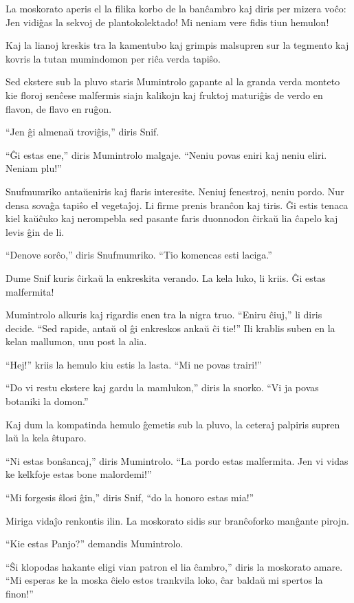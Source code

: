 La moskorato aperis el la filika korbo de la banĉambro kaj diris per mizera voĉo: Jen vidiĝas la sekvoj de plantokolektado! Mi neniam vere fidis tiun hemulon!

Kaj la lianoj kreskis tra la kamentubo kaj grimpis malsupren sur la tegmento kaj kovris la tutan mumindomon per riĉa verda tapiŝo.

Sed ekstere sub la pluvo staris Mumintrolo gapante al la granda verda monteto kie floroj senĉese malfermis siajn kalikojn kaj fruktoj maturiĝis de verdo en flavon, de flavo en ruĝon.

``Jen ĝi almenaŭ troviĝis,'' diris Snif.

``Ĝi estas ene,'' diris Mumintrolo malgaje. ``Neniu povas eniri kaj neniu eliri. Neniam plu!''

Snufmumriko antaŭeniris kaj flaris interesite. Neniuj fenestroj, neniu pordo. Nur densa sovaĝa tapiŝo el vegetaĵoj. Li firme prenis branĉon kaj tiris. Ĝi estis tenaca kiel kaŭĉuko kaj nerompebla sed pasante faris duonnodon ĉirkaŭ lia ĉapelo kaj levis ĝin de li.

``Denove sorĉo,'' diris Snufmumriko. ``Tio komencas esti laciga.''

Dume Snif kuris ĉirkaŭ la enkreskita verando. La kela luko, li kriis. Ĝi estas malfermita!

Mumintrolo alkuris kaj rigardis enen tra la nigra truo. ``Eniru ĉiuj,'' li diris decide. ``Sed rapide, antaŭ ol ĝi enkreskos ankaŭ ĉi tie!'' Ili krablis suben en la kelan mallumon, unu post la alia.

``Hej!'' kriis la hemulo kiu estis la lasta. ``Mi ne povas trairi!''

``Do vi restu ekstere kaj gardu la mamlukon,'' diris la snorko. ``Vi ja povas botaniki la domon.''

Kaj dum la kompatinda hemulo ĝemetis sub la pluvo, la ceteraj palpiris supren laŭ la kela ŝtuparo.

``Ni estas bonŝancaj,'' diris Mumintrolo. ``La pordo estas malfermita. Jen vi vidas ke kelkfoje estas bone malordemi!''

``Mi forgesis ŝlosi ĝin,'' diris Snif, ``do la honoro estas mia!''

Miriga vidaĵo renkontis ilin. La moskorato sidis sur branĉoforko manĝante pirojn.

``Kie estas Panjo?'' demandis Mumintrolo.

``Ŝi klopodas hakante eligi vian patron el lia ĉambro,'' diris la moskorato amare. ``Mi esperas ke la moska ĉielo estos trankvila loko, ĉar baldaŭ mi spertos la finon!''

